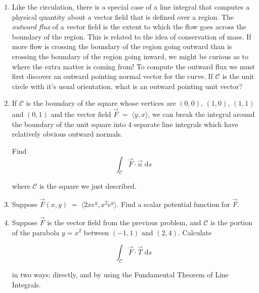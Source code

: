 \documentclass{amsart}
\newcommand{\ds}{\;\mbox{d}s}
\begin{document}
\begin{enumerate}
\vfill

\newpage

\item Like the circulation, there is a special case of a line integral that computes a physical quantity about a vector field that is defined over a region.  The {\em outward flux} of a vector field is the extent to which the flow goes across the boundary of the region.  This is related to the idea of conservation of mass.  If more flow is crossing the boundary of the region going outward than is crossing the boundary of the region going inward, we might be curious as to where the extra matter is coming from!   To compute the outward flux we must first discover an outward pointing normal vector for the curve.  If $\mathcal C$ is the unit circle with it's usual orientation, what is an outward pointing unit vector?

\vfill



\item If $\mathcal C$ is the boundary of the square whose vertices are $(0,0)$, $(1,0)$, $(1,1)$ and $(0,1)$ and the vector field $\vec{F} \; = \; \langle y, x \rangle$, we can break the integral around the boundary of the unit square into 4 separate line integrals which have relatively obvious outward normals.

Find 
\[ \int_{\mathcal C} \vec{F} \cdot \vec{n} \ds \] 

\noindent where $\mathcal C$ is the square we just described.

\vfill

\newpage

\item Suppose $\vec{F}(x,y) \; = \; \langle 2x e^y, x^2 e^y \rangle$.  Find a scalar potential function for $\vec{F}$.

\vfill



\item Suppose $\vec{F}$ is the vector field from the previous problem, and $\mathcal C$ is the portion of the parabola $y=x^2$ between $(-1,1)$ and $(2,4)$.  Calculate 

\[ \int_{\mathcal C} \vec{F} \cdot \vec{T} \ds \] 

\noindent in two ways:  directly, and by using the Fundamental Theorem of Line Integrals.

\vfill

\end{enumerate}
\end{document}
